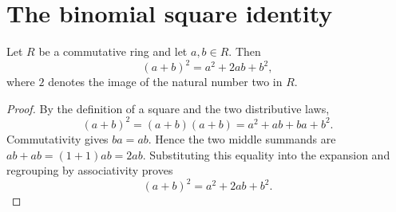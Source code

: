 \chapter{The binomial square identity}

\begin{theorem}
  \label{thm:binomial-square-identity}
  Let $R$ be a commutative ring and let $a,b\in R$. Then
  \[
    (a+b)^2=a^2+2ab+b^2,
  \]
  where $2$ denotes the image of the natural number two in $R$.
\end{theorem}
\begin{proof}

\leanok
  By the definition of a square and the two distributive laws,
  \[
    (a+b)^2=(a+b)(a+b)=a^2+ab+ba+b^2.
  \]
  Commutativity gives $ba=ab$. Hence the two middle summands are
  $ab+ab=(1+1)ab=2ab$. Substituting this equality into the expansion and
  regrouping by associativity proves
  \[
    (a+b)^2=a^2+2ab+b^2.
  \]
\end{proof}
